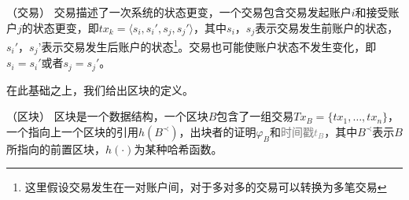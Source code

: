\begin{definition}
（交易） 交易描述了一次系统的状态更变，一个交易包含交易发起账户$i$和接受账户$j$的状态更变，即$tx_k=\langle s_i,s_i',s_j,s_j'\rangle$，其中$s_i$，$s_j$表示交易发生前账户的状态，$s_i'$，$s_j’$表示交易发生后账户的状态\footnote{这里假设交易发生在一对账户间，对于多对多的交易可以转换为多笔交易}。交易也可能使账户状态不发生变化，即$s_i=s_i'$或者$s_j=s_j'$。
\end{definition}

在此基础之上，我们给出区块的定义。

\begin{definition}
\label{def:block}
（区块） 区块是一个数据结构，一个区块$B$包含了一组交易$Tx_B=\{tx_1,\dots,tx_n\}$，一个指向上一个区块的引用$h(B^{\prec})$，出块者的证明$\varphi_B$和\textcolor{gray}{时间戳$t_B$}，其中$B^{\prec}$表示$B$所指向的前置区块，$h(\cdot)$为某种哈希函数。
\end{definition}



